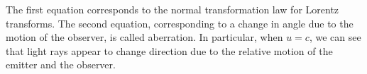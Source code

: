 \documentclass{article}
\begin{document}
The first equation corresponds to the normal transformation law for Lorentz transforms. The second equation, corresponding to a change in angle due to the motion of the observer, is called aberration. In particular, when $u = c$, we can see that light rays appear to change direction due to the relative motion of the emitter and the observer.
\end{document}
